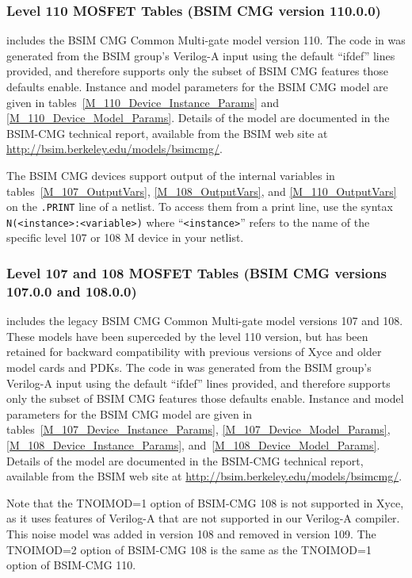 \subsubsection{Level 110 MOSFET Tables (BSIM CMG version 110.0.0)}
\Xyce{} includes the BSIM CMG Common Multi-gate model version 110.
The code in \Xyce{} was generated from the BSIM group's Verilog-A
input using the default ``ifdef'' lines provided, and therefore
supports only the subset of BSIM CMG features those defaults enable.
Instance and model parameters for the BSIM CMG model are given in
tables~\ref{M_110_Device_Instance_Params} and
\ref{M_110_Device_Model_Params}.  Details of the model are documented
in the BSIM-CMG technical report\cite{BSIMCMG:Manual}, available from
the BSIM web site at
\url{http://bsim.berkeley.edu/models/bsimcmg/}.

The BSIM CMG devices support output of the internal variables in
tables~\ref{M_107_OutputVars}, \ref{M_108_OutputVars}, and  \ref{M_110_OutputVars} on the \texttt{.PRINT} line of a netlist.
To access them from a print line, use the syntax
\texttt{N(<instance>:<variable>)} where ``\texttt{<instance>}'' refers to the
name of the specific level 107 or 108 M device in your netlist.





\subsubsection{Level 107  and 108 MOSFET Tables (BSIM CMG versions 107.0.0 and 108.0.0)}
\Xyce{} includes the legacy BSIM CMG Common Multi-gate model versions 107 and 108.
These models have been superceded by the level 110 version, but has been
retained for backward compatibility with previous versions of Xyce and
older model cards and PDKs.  The code in \Xyce{} was generated from the BSIM
group's Verilog-A input using the default ``ifdef'' lines provided,
and therefore supports only the subset of BSIM CMG features those
defaults enable.  Instance and model parameters for the BSIM CMG model
are given in tables~\ref{M_107_Device_Instance_Params},
\ref{M_107_Device_Model_Params}, \ref{M_108_Device_Instance_Params},
and~\ref{M_108_Device_Model_Params}.  Details of the model are documented
in the BSIM-CMG technical report\cite{BSIMCMG:Manual}, available from
the BSIM web site at \url{http://bsim.berkeley.edu/models/bsimcmg/}.

Note that the TNOIMOD=1 option of BSIM-CMG 108 is not supported in
Xyce, as it uses features of Verilog-A that are not supported in our
Verilog-A compiler.  This noise model was added in version 108 and
removed in version 109.  The TNOIMOD=2 option of BSIM-CMG 108 is the
same as the TNOIMOD=1 option of BSIM-CMG 110.

